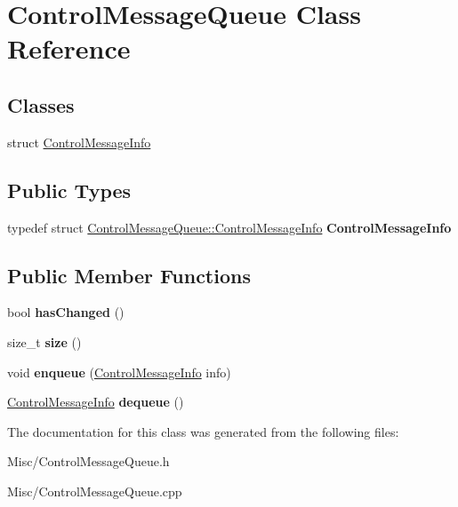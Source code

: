 \hypertarget{classControlMessageQueue}{}\section{Control\+Message\+Queue Class Reference}
\label{classControlMessageQueue}
\subsection*{Classes}
\begin{DoxyCompactItemize}
\item 
struct \mbox{\hyperlink{structControlMessageQueue_1_1ControlMessageInfo}{Control\+Message\+Info}}
\end{DoxyCompactItemize}
\subsection*{Public Types}
\begin{DoxyCompactItemize}
\item 
\mbox{\label{classControlMessageQueue_a50df92d449dae01e49fd0e836c7d1f2e}} 
typedef struct \mbox{\hyperlink{structControlMessageQueue_1_1ControlMessageInfo}{Control\+Message\+Queue\+::\+Control\+Message\+Info}} {\bfseries Control\+Message\+Info}
\end{DoxyCompactItemize}
\subsection*{Public Member Functions}
\begin{DoxyCompactItemize}
\item 
\mbox{\label{classControlMessageQueue_ad0d97de85cb34b781fde757b665fb22e}} 
bool {\bfseries has\+Changed} ()
\item 
\mbox{\label{classControlMessageQueue_a3b2d120facfc58fcdc315a806d76851a}} 
size\+\_\+t {\bfseries size} ()
\item 
\mbox{\label{classControlMessageQueue_a766bed9ca18a663bba82cc32c253049a}} 
void {\bfseries enqueue} (\mbox{\hyperlink{structControlMessageQueue_1_1ControlMessageInfo}{Control\+Message\+Info}} info)
\item 
\mbox{\label{classControlMessageQueue_a95142f7602e0a64b38a8f1cb02ef9497}} 
\mbox{\hyperlink{structControlMessageQueue_1_1ControlMessageInfo}{Control\+Message\+Info}} {\bfseries dequeue} ()
\end{DoxyCompactItemize}


The documentation for this class was generated from the following files\+:\begin{DoxyCompactItemize}
\item 
Misc/Control\+Message\+Queue.\+h\item 
Misc/Control\+Message\+Queue.\+cpp\end{DoxyCompactItemize}
